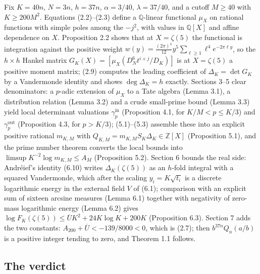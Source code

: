 \documentclass[11pt]{article}
\theoremstyle{definition}
\newcommand{\z}{\zeta(5)}
\newcommand{\Ub}{\overline{U}}
\newcommand{\gin}{\gamma_p^{\mathrm{in}}}
\newcommand{\gout}{\gamma_p^{\mathrm{out}}}
\begin{document}
Fix $K=40n$, $N=3n$, $h=37n$, $\alpha=3/40$, $\lambda=37/40$, and a cutoff $M\ge 40$ with
$K\ge 200M^2$. Equations (2.2)--(2.3) define a $\mathbb{Q}$-linear functional
$\mu_X$ on rational functions with simple poles among the $-j^2$, with values in $\mathbb{Q}[X]$
and affine dependence on $X$. Proposition 2.2 shows that at $X=\z$ the functional
is integration against the positive weight $w(y)=\tfrac{(2\pi)^4}{12}y^5\sum_{\ell\ge1}\ell^4e^{-2\pi\ell y}$,
so the $h\times h$ Hankel matrix $G_K(X)=[\mu_X(D_N^6t^{i+j}/D_K)]$ is at $X=\z$ a positive
moment matrix; (2.9) computes the leading coefficient of $\Delta_K=\det G_K$ by a Vandermonde
identity and shows $\deg\Delta_K=h$ exactly. Sections 3--5 clear denominators: a $p$-adic
extension of $\mu_X$ to a Tate algebra (Lemma 3.1), a distribution relation (Lemma 3.2) and a
crude small-prime bound (Lemma 3.3) yield local determinant valuations $\gin$ (Proposition 4.1,
for $K/M<p\le K/3$) and $\gout$ (Proposition 4.3, for $p>K/3$); (5.1)--(5.3) assemble these into
an explicit positive rational $m_{K,M}$ with $Q_{K,M}=m_{K,M}S_K\Delta_K\in\mathbb{Z}[X]$
(Proposition 5.1), and the prime number theorem converts the local bounds into
$\limsup K^{-2}\log m_{K,M}\le A_M$ (Proposition 5.2). Section 6 bounds the real side:
Andr\'eief's identity (6.10) writes $\Delta_K(\z)$ as an $h$-fold integral with a squared
Vandermonde, which after the scaling $y_i=K\sqrt{t_i}$ is a discrete logarithmic energy in the
external field $V$ of (6.1); comparison with an explicit sum of sixteen arcsine measures
(Lemma 6.1) together with negativity of zero-mass logarithmic energy (Lemma 6.2) gives
$\log F_K(\z)\le\Ub K^2+24K\log K+200K$ (Proposition 6.3). Section 7 adds the two constants:
$A_{200}+\Ub<-139/8000<0$, which is (2.7); then $b^{37n}Q_n(a/b)$ is a positive integer tending
to zero, and Theorem 1.1 follows.

\subsection*{The verdict}
\end{document}
